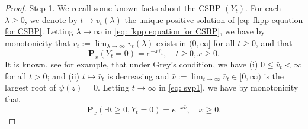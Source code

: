 \documentclass[12pt,a4paper]{amsart}
\theoremstyle{plain}
\theoremstyle{definition}
\numberwithin{equation}{section}
\begin{document}
\begin{proof}
  Step 1. We recall some known facts about the CSBP $(Y_t)$.
  For each $\lambda \geq 0$, we denote by $t\mapsto v_t(\lambda)$ the unique positive solution of \eqref{eq: fkpp equation for CSBP}.
  Letting $\lambda \to \infty$ in \eqref{eq: fkpp equation for CSBP}, we have by monotonicity that $\bar v_t:= \lim_{\lambda \to \infty}v_t(\lambda)$ exists in $(0,\infty]$ for all $t\geq 0$, and that
  \begin{equation}
    \label{eq: svp1}
    \mathbf P_x(Y_t = 0)=e^{-x\bar v_t}, \quad t\geq 0, x\ge 0.
  \end{equation}
  It is known, see \cite[Theorems 3.5--3.8]{Li2011Measure-valued} for example, that under Grey's condition, 
  we have (i) $0\leq \bar v_t < \infty$ for all $t>0$; and (ii) $t\mapsto \bar v_t$ is decreasing and $\bar v:= \lim_{t\to \infty} \bar v_t \in [0,\infty)$ is the largest root of $\psi(z) = 0$.
  Letting $t \to \infty$ in \eqref{eq: svp1}, we have by monotonicity that
  \[
    \mathbf P_x(\exists t \geq 0, Y_t = 0)
    = e^{-x\bar v}, \quad x\geq 0.
  \]
  

\end{proof}
\end{document}
